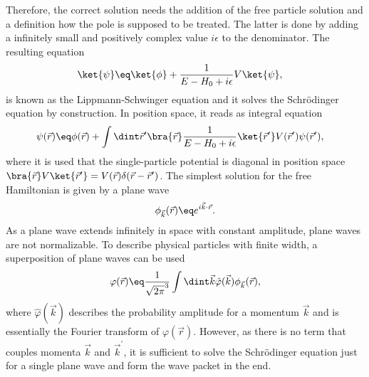 \documentclass[\main/dresen_thesis.tex]{subfiles}
\begin{document}
Therefore, the correct solution needs the addition of the free particle solution and a definition how the pole is supposed to be treated. 
The latter is done by adding a infinitely small and positively complex value $i\epsilon$ to the denominator. The resulting equation
\begin{align}
  \ket{\psi} &\eq \ket{\phi} +  \frac{1}{E - H_0 + i \epsilon} V \ket{\psi},
\end{align}
is known as the Lippmann-Schwinger equation and it solves the Schr\"odinger equation by construction. 
In position space, it reads as integral equation
\begin{align}
  \psi (\vec{r}) &\eq \phi(\vec{r}) + \int \dint \vec{r}^\prime \bra{\vec{r}}\frac{1}{E - H_0 + i \epsilon} \ket{\vec{r}^\prime} V (\vec{r}^\prime)\psi (\vec{r}^\prime),
  \label{eq:theoreticalBackground:scattering:scatteringTheory:LippmanSchwingerIntegralEquation}
\end{align}
where it is used that the single-particle potential is diagonal in position space $\bra{\vec{r}} V \ket{\vec{r}^\prime} = V(\vec{r}) \delta(\vec{r} - \vec{r}^\prime)$. 
The simplest solution for the free Hamiltonian is given by a plane wave
\begin{align}
  \phi_{\vec{k}}(\vec{r}) \eq e^{i\vec{k} \cdot \vec{r}}.
\end{align}
As a plane wave extends infinitely in space with constant amplitude, plane waves are not normalizable.
To describe physical particles with finite width, a superposition of plane waves can be used
\begin{align}
  \varphi(\vec{r}) \eq \frac{1}{\sqrt{2 \pi}^3} \int \dint \vec{k} \hat{\varphi} (\vec{k}) \phi_{\vec{k}}(\vec{r}),
\end{align}
where $\hat{\varphi} (\vec{k})$ describes the probability amplitude for a momentum $\vec{k}$ and is essentially the Fourier transform of $\varphi(\vec{r})$. 
However, as there is no term that couples momenta $\vec{k}$ and $\vec{k}^\prime$, it is sufficient to solve the Schr\"odinger equation just for a single plane wave and form the wave packet in the end.
\end{document}
